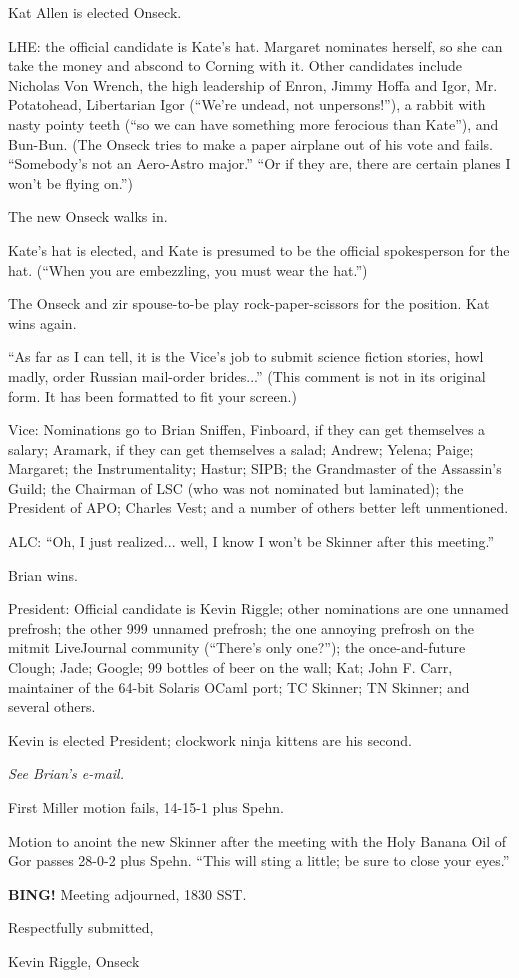 \documentclass[10pt]{article}
\newcommand{\bing}{{\bf BING!} }
\newcommand{\ps}{ plus Spehn\xspace}
\begin{document}
Kat Allen is elected Onseck.

LHE: the official candidate is Kate's hat.  Margaret nominates herself, so she can take the money
and abscond to Corning with it.  Other candidates include Nicholas Von Wrench, the high leadership
of Enron, Jimmy Hoffa and Igor, Mr. Potatohead, Libertarian Igor (``We're undead, not 
unpersons!''), a rabbit with nasty pointy teeth (``so we can have something more ferocious than 
Kate''), and Bun-Bun.  (The Onseck tries to make a paper airplane out of his vote and fails.  
``Somebody's not an Aero-Astro major.''  ``Or if they are, there are certain planes I won't be
flying on.'')

The new Onseck walks in.

Kate's hat is elected, and Kate is presumed to be the official spokesperson for the hat.  (``When
you are embezzling, you must wear the hat.'')

The Onseck and zir spouse-to-be play rock-paper-scissors for the position.  Kat wins again.

``As far as I can tell, it is the Vice's job to submit science fiction stories, howl madly, 
order Russian mail-order brides...''  (This comment is not in its original form.  It has been
formatted to fit your screen.)

Vice: Nominations go to Brian Sniffen, Finboard, if they can get themselves a salary; Aramark, if
they can get themselves a salad; Andrew; Yelena; Paige; Margaret; the Instrumentality; Hastur;
SIPB; the Grandmaster of the Assassin's Guild; the Chairman of LSC (who was not nominated but
laminated); the President of APO; Charles Vest; and a number of others better left unmentioned. 

ALC: ``Oh, I just realized... well, I know I won't be Skinner after this meeting.''

Brian wins.

President: Official candidate is Kevin Riggle; other nominations are one unnamed prefrosh; the 
other 999 unnamed prefrosh; the one annoying prefrosh on the mitmit LiveJournal community 
(``There's only one?''); the once-and-future Clough; Jade; Google; 99 bottles of beer on the wall; 
Kat; John F. Carr, maintainer of the 64-bit Solaris OCaml port; TC Skinner; TN Skinner; and 
several others.

Kevin is elected President; clockwork ninja kittens are his second.

\emph{See Brian's e-mail.}

First Miller motion fails, 14-15-1\ps.

Motion to anoint the new Skinner after the meeting with the Holy Banana Oil of Gor passes 28-0-2\ps.
``This will sting a little; be sure to close your eyes.''

\bing
\noindent
Meeting adjourned, 1830 SST.

\vspace{18pt}

\centerline{Respectfully submitted,}
\centerline{Kevin Riggle, Onseck}
\end{document}
